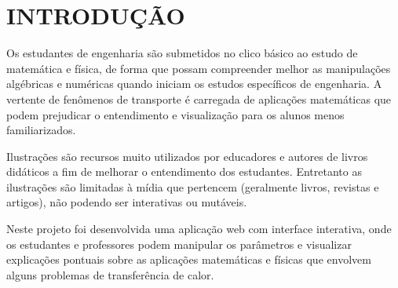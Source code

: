 \documentclass[12pt,a4paper]{article}
\begin{document}
\begin{center}
    \tableofcontents
\end{center}

\newpage

\section{INTRODUÇÃO}

Os estudantes de engenharia são submetidos no clico básico ao estudo de matemática e física, de forma que possam compreender melhor as manipulações algébricas e numéricas quando iniciam os estudos específicos de engenharia. A vertente de fenômenos de transporte é carregada de aplicações matemáticas que podem prejudicar o entendimento e visualização para os alunos menos familiarizados.

Ilustrações são recursos muito utilizados por educadores e autores de livros didáticos a fim de melhorar o entendimento dos estudantes. Entretanto as ilustrações são limitadas à mídia que pertencem (geralmente livros, revistas e artigos), não podendo ser interativas ou mutáveis.

Neste projeto foi desenvolvida uma aplicação web com interface interativa, onde os estudantes e professores podem manipular os parâmetros e visualizar explicações pontuais sobre as aplicações matemáticas e físicas que envolvem alguns problemas de transferência de calor.
\end{document}
